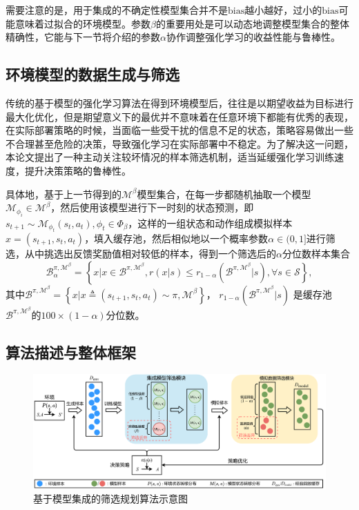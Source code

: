 需要注意的是，用于集成的不确定性模型集合并不是$\mathrm{bias}$越小越好，过小的$\mathrm{bias}$可能意味着过拟合的环境模型。参数$\beta$的重要用处是可以动态地调整模型集合的整体精确性，它能与下一节将介绍的参数$\alpha$协作调整强化学习的收益性能与鲁棒性。

\subsection{环境模型的数据生成与筛选}\label{sec:rollout-method}

传统的基于模型的强化学习算法在得到环境模型后，往往是以期望收益为目标进行最大化优化，但是期望意义下的最优并不意味着在任意环境下都能有优秀的表现，在实际部署策略的时候，当面临一些受干扰的信息不足的状态，策略容易做出一些不合理甚至危险的决策，导致强化学习在实际部署中不稳定。为了解决这一问题，本论文提出了一种主动关注较坏情况的样本筛选机制，适当延缓强化学习训练速度，提升决策策略的鲁棒性。

具体地，基于上一节得到的$\mathcal{M}^{\beta}$模型集合，在每一步都随机抽取一个模型$\mathcal{M}_{\phi_i}\in\mathcal{M}^\beta$，然后使用该模型进行下一时刻的状态预测，即$s_{t+1}\sim \mathcal{M}_{\phi_t}(s_t,a_t), \phi_t\in\Phi_\beta$，这样的一组状态和动作组成模拟样本$x=\left(s_{t+1},s_t,a_t\right)$，填入缓存池，然后相似地以一个概率参数$\alpha\in(0,1]$进行筛选，从中挑选出反馈奖励值相对较低的样本，得到一个筛选后的$\alpha$分位数样本集合
\begin{equation}\label{def:batch-alpha-beta}
    \mathcal{B}_\alpha^{\pi,\mathcal{M}^\beta}=\left\{x|x\in\mathcal{B}^{\pi,\mathcal{M}^\beta},r(x|s)\leq r_{1-\alpha}(\mathcal{B}^{\pi,\mathcal{M}^\beta}|s), \forall s \in \mathcal{S}\right\},
\end{equation}
其中$\mathcal{B}^{\pi,\mathcal{M}^\beta}=\left\{x|x\triangleq\left(s_{t+1},s_t,a_t\right)\sim\pi,\mathcal{M}^\beta\right\}$， $r_{1-\alpha}(\mathcal{B}^{\pi,\mathcal{M}^\beta}|s)$ 是缓存池 $\mathcal{B}^{\pi,\mathcal{M}^\beta}$的$100\times(1-\alpha)$分位数。

\subsection{算法描述与整体框架}\label{sec:mbdp-description}

\begin{figure}[t]
\centering
\includegraphics[width=\textwidth]{figures/mbdp.pdf}
\caption{基于模型集成的筛选规划算法示意图}
\label{fig:mbdp-structure}
\end{figure}

